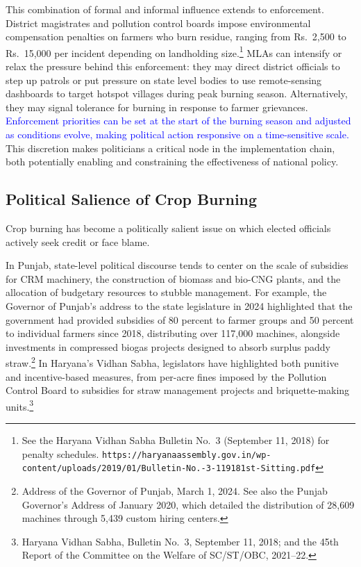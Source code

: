 \documentclass[12pt]{article}
\begin{document}
This combination of formal and informal influence extends to enforcement. District magistrates and pollution control boards impose environmental compensation penalties on farmers who burn residue, ranging from Rs.~2,500 to Rs.~15,000 per incident depending on landholding size.\footnote{See the Haryana Vidhan Sabha Bulletin No.\ 3 (September 11, 2018) for penalty schedules. \texttt{https://haryanaassembly.gov.in/wp-content/uploads/2019/01/Bulletin-No.-3-119181st-Sitting.pdf}} MLAs can intensify or relax the pressure behind this enforcement: they may direct district officials to step up patrols or put pressure on state level bodies to use remote-sensing dashboards to target hotspot villages during peak burning season. Alternatively, they may signal tolerance for burning in response to farmer grievances. \textcolor{blue}{Enforcement priorities can be set at the start of the burning season and adjusted as conditions evolve, making political action responsive on a time-sensitive scale.}
This discretion makes politicians a critical node in the implementation chain, both potentially enabling and constraining the effectiveness of national policy.
 
 
\subsection{Political Salience of Crop Burning}\label{ssec:salience}
 
 
Crop burning has become a politically salient issue on which elected officials actively seek credit or face blame. %
 
In Punjab, state-level political discourse tends to center on the scale of subsidies for CRM machinery, the construction of biomass and bio-CNG plants, and the allocation of budgetary resources to stubble management. For example, the Governor of Punjab's address to the state legislature in 2024 highlighted that the government had provided subsidies of 80 percent to farmer groups and 50 percent to individual farmers since 2018, distributing over 117,000 machines, alongside investments in compressed biogas projects designed to absorb surplus paddy straw.\footnote{Address of the Governor of Punjab, March 1, 2024. See also the Punjab Governor's Address of January 2020, which detailed the distribution of 28,609 machines through 5,439 custom hiring centers.} In Haryana's Vidhan Sabha, legislators have highlighted both punitive and incentive-based measures, from per-acre fines imposed by the Pollution Control Board to subsidies for straw management projects and briquette-making units.\footnote{Haryana Vidhan Sabha, Bulletin No.\ 3, September 11, 2018; and the 45th Report of the Committee on the Welfare of SC/ST/OBC, 2021--22.}
 
\end{document}

